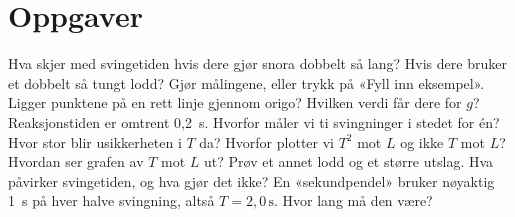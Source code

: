 \documentclass[11pt]{article}
\begin{document}
\section*{Oppgaver}

\begin{oppgaveliste}
\oppgave {}Hva skjer med svingetiden hvis dere gjør snora dobbelt så lang? Hvis dere bruker et dobbelt så tungt lodd?
\svar
\oppgave {}Gjør målingene, eller trykk på «Fyll inn eksempel». Ligger punktene på en rett linje gjennom origo? Hvilken verdi får dere for $g$?
\svar
\oppgave {}Reaksjonstiden er omtrent 0,2~s. Hvorfor måler vi ti svingninger i stedet for én? Hvor stor blir usikkerheten i $T$ da?
\svar
\oppgave {}Hvorfor plotter vi $T^{2}$ mot $L$ og ikke $T$ mot $L$? Hvordan ser grafen av $T$ mot $L$ ut?
\svar
\oppgave {}Prøv et annet lodd og et større utslag. Hva påvirker svingetiden, og hva gjør det ikke?
\svar
\oppgave {}En «sekundpendel» bruker nøyaktig 1~s på hver halve svingning, altså $T = 2{,}0\,\mathrm{s}$. Hvor lang må den være?
\svar
\end{oppgaveliste}
\end{document}
